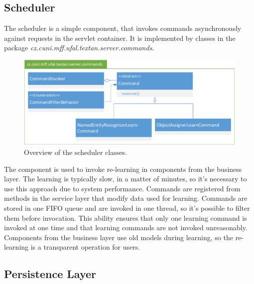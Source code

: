 \subsection{Scheduler}
The scheduler is a simple component, that invokes commands asynchronously against
requests in the servlet container. It is implemented by classes in the package
\emph{cz.\-cuni.\-mff.\-ufal.\-textan.\-server.\-commands}.

\begin{figure}[!htb]
        \centering
        \includegraphics[width=\textwidth]{Images/Commands}
        \caption{Overview of the scheduler classes.}
        \label{fig:CommandsOverview}
\end{figure}

The component is used to invoke re-learning in components from the business layer.
The learning is typically slow, in a matter of minutes, so it's necessary to use
this approach due to system performance. Commands are registered from methods in
the service layer that modify data used for learning. Commands are stored in one
FIFO queue and are invoked in one thread, so it's possible to filter them before
invocation. This ability ensures that only one learning command is invoked at one
time and that learning commands are not invoked unreasonably. Components from
the business layer use old models during learning, so the re-learning is a transparent
operation for users.

\subsection{Persistence Layer}




